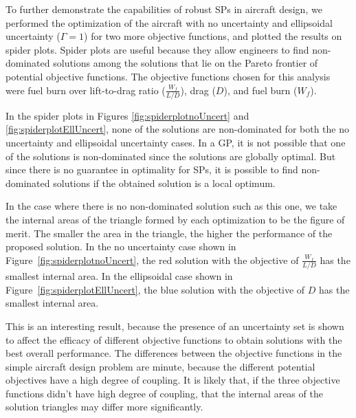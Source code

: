 

To further demonstrate the capabilities of robust SPs in aircraft design,
we performed the optimization of the aircraft with no uncertainty and ellipsoidal uncertainty ($\Gamma = 1$)
for two more objective functions, and plotted the results on spider plots.
Spider plots are useful because they allow engineers to find non-dominated solutions among the solutions
that lie on the Pareto frontier of potential objective functions. The objective functions chosen
for this analysis were fuel burn over lift-to-drag ratio ($\frac{W_f}{L/D}$), drag ($D$), and fuel burn ($W_f$).

In the spider plots in Figures \ref{fig:spiderplotnoUncert} and \ref{fig:spiderplotEllUncert},
none of the solutions are non-dominated for both the no uncertainty and ellipsoidal uncertainty cases.
In a GP, it is not possible that one of the solutions is non-dominated since the solutions are globally optimal.
But since there is no guarantee in optimality for SPs, it is possible to find non-dominated solutions if
the obtained solution is a local optimum.

In the case where there is no non-dominated solution such as this one,
we take the internal areas of the triangle formed by each optimization to be the figure of merit.
The smaller the area in the triangle, the higher the performance of the proposed solution.
In the no uncertainty case shown in Figure~\ref{fig:spiderplotnoUncert}, the red solution with the
objective of $\frac{W_f}{L/D}$ has the smallest internal area. In the ellipsoidal case shown in
Figure~\ref{fig:spiderplotEllUncert}, the blue solution with the objective of $D$ has the smallest internal area.

This is an interesting result, because the presence of an uncertainty set is
shown to affect the efficacy of different objective functions to obtain solutions
with the best overall performance. The differences between the objective functions
in the simple aircraft design problem are minute, because the different potential objectives
have a high degree of coupling. It is likely that, if the three objective functions didn't
have high degree of coupling, that the internal areas of the solution triangles may differ
more significantly.

